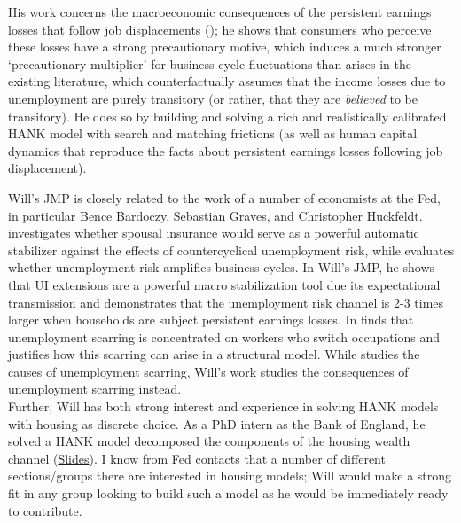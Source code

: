 \documentclass[\econtexRoot/Letter]{subfiles}
\begin{document}
\setcounter{page}{0}


His work concerns the macroeconomic consequences of the persistent earnings losses that follow job displacements (\cite{jacobson1993}); he shows that consumers who perceive these losses have a strong precautionary motive, which induces a much stronger `precautionary multiplier' for business cycle fluctuations than arises in the existing literature, which counterfactually assumes that the income losses due to unemployment are purely transitory (or rather, that they are \textit{believed} to be transitory). He does so by building and solving a rich and realistically calibrated HANK model with search and matching frictions (as well as human capital dynamics that reproduce the facts about persistent earnings losses following job displacement).

Will's JMP is closely related to the work of a number of economists at the Fed, in particular Bence Bardoczy, Sebastian Graves, and Christopher Huckfeldt.  \cite{BardoczySpousal} investigates whether spousal insurance would serve as a powerful automatic stabilizer against the effects of countercyclical unemployment risk, while \cite{gravesUrisk} evaluates whether unemployment risk amplifies business cycles. In Will's JMP, he shows that UI extensions are a powerful macro stabilization tool due its expectational transmission and demonstrates that the unemployment risk channel is 2-3 times larger when households are subject persistent earnings losses. In \cite{huckfeldtUscar} finds that unemployment scarring is concentrated on workers who switch occupations and justifies how this scarring can arise in a structural model. While \cite{huckfeldtUscar} studies the causes of unemployment scarring, Will's work studies the consequences of unemployment scarring instead.\\

Further, Will has both strong interest and experience in solving HANK models with housing as discrete choice. As a PhD intern as the Bank of England, he solved a HANK model decomposed the components of the housing wealth channel (\href{https://github.com/wdu9/HANK_Housing_Block/blob/main/HANK_Housing_Slides\%20slides.pdf}{Slides}).  I know from Fed contacts that a number of different sections/groups there are interested in housing models; Will would make a strong fit in any group looking to build such a model as he would be immediately ready to contribute. \\
\end{document}
